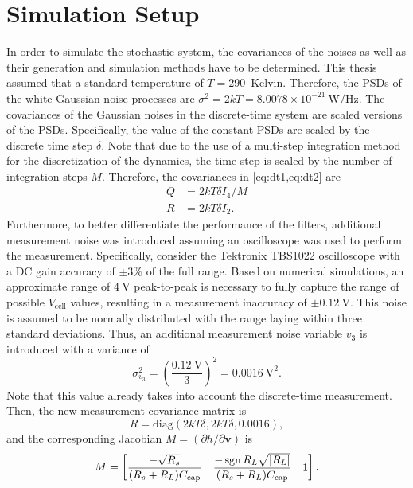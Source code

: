 \documentclass[../zhang_thesis.tex]{subfiles}
\begin{document}
\section{Simulation Setup}

In order to simulate the stochastic system, the covariances of the noises as well as their generation and simulation methods have to be determined. This thesis assumed that a standard temperature of $T=290$~Kelvin. Therefore, the PSDs of the white Gaussian noise processes are $\sigma^2=2kT=8.0078\times 10^{-21}~\textrm{W}/\textrm{Hz}$. The covariances of the Gaussian noises in the discrete-time system are scaled versions of the PSDs. Specifically, the value of the constant PSDs are scaled by the
discrete time step $\delta$. Note that due to the use of a multi-step integration method for the discretization of the dynamics, the time step is scaled by the number of integration steps $M$. Therefore, the covariances in \cref{eq:dt1,eq:dt2} are
\begin{align}
    Q &= 2kT\delta I_4 / M \\
    R &= 2kT\delta I_2.
\end{align}
Furthermore, to better differentiate the performance of the filters, additional measurement noise was introduced assuming an oscilloscope was used to perform the measurement.
Specifically, consider the Tektronix TBS1022 oscilloscope with a DC gain accuracy of $\pm 3\%$ of the full range. Based on numerical simulations, an approximate range of $4~\mathrm{V}$ peak-to-peak is necessary to fully capture the range of possible $V_\text{cell}$ values, resulting in a measurement inaccuracy of $\pm 0.12~\mathrm{V}$. This noise is assumed to be normally distributed with the range laying within three standard deviations. Thus, an additional measurement noise variable $v_3$ is introduced with
a variance of
\begin{equation}
    \sigma_{v_3}^2 = \left( \frac{0.12~\mathrm{V}}{3} \right)^2 = 0.0016~\mathrm{V}^2.
\end{equation}
Note that this value already takes into account the discrete-time measurement. Then, the new measurement covariance matrix is
\begin{equation}
    R = \mathrm{diag}(2kT\delta,2kT\delta,0.0016),
\end{equation}
and the corresponding Jacobian $M=(\partial h/\partial\mathbf{v})$ is
\begin{equation}
    M = \begin{bmatrix}
         \dfrac{-\sqrt{R_s}}{(R_s+R_L)C_\text{cap}} & \dfrac{-\operatorname{sgn}{R_L}\sqrt{|R_L|}}{(R_s+R_L)C_\text{cap}} & 1
        \end{bmatrix} .
\end{equation}
\end{document}
